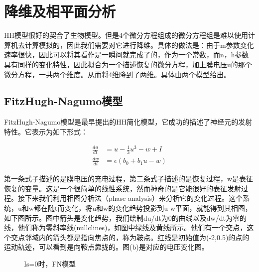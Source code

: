 \documentclass[12pt, a4paper, oneside]{ctexbook}
\begin{document}
\chapter{降维及相平面分析}

HH模型很好的契合了生物模型。但是4个微分方程组成的微分方程组是难以使用计算机去计算模拟的，因此我们需要对它进行降维。具体的做法是：由于m参数变化速率很快，因此可以将其看作是一瞬间就完成了的，作为一个常数，而n，h参数具有同样的变化特性，因此拟合为一个描述恢复的微分方程，加上膜电压u的那个微分方程，一共两个维度。从而将4维降到了两维。具体由两个模型给出。

\section{FitzHugh-Nagumo模型}

FitzHugh-Nagumo模型是最早提出的HH简化模型，它成功的描述了神经元的发射特性。它表示为如下形式：

\begin{equation}
    \begin{aligned}
        \frac{du}{dt}&=u-\frac{1}{3}u^3-w+I\\
        \frac{dw}{dt}&=\epsilon(b_0+b_1 u-w)
    \end{aligned}
\end{equation}

第一条式子描述的是膜电压的充电过程，第二条式子描述的是恢复过程，w是表征恢复的变量。这是一个很简单的线性系统，然而神奇的是它能很好的表征发射过程。接下来我们利用相图分析法（phase analysis）来分析它的变化过程。这个系统，u和w都在随t而变化，将u和w的变化趋势投影到u-w平面，就能得到其相图，如下图所示。图中箭头是变化趋势，我们绘制du/dt为0的曲线以及dw/dt为零的线，他们称为零斜率线(nullclines)，如图中绿线及黄线所示。他们有一个交点，这个交点邻域内的箭头都是指向焦点的，称为鞍点。红线是初始值为(-2,0.5)的点的运动轨迹，可以看到是向鞍点靠拢的。图(b)是对应的电压变化图。

\begin{figure}[H]
    \centering
    \caption{Is=0时，FN模型}
\end{figure}
\end{document}
